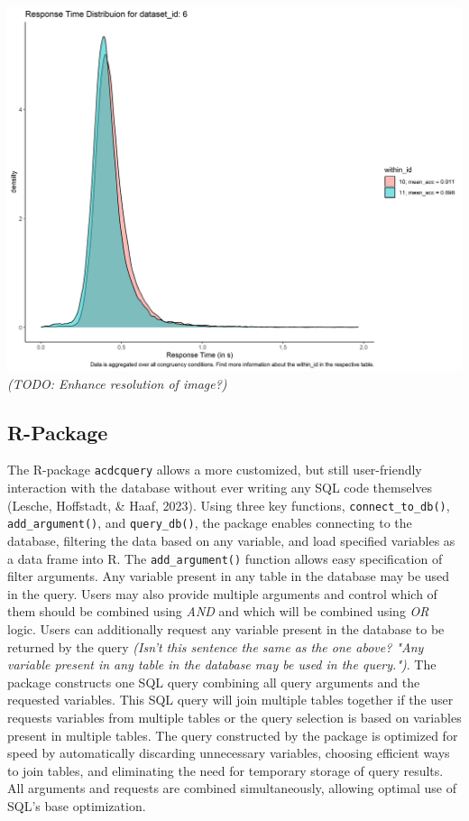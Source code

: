 \documentclass[
  man,floatsintext]{apa6}
\begin{document}
\includegraphics{images/example_descriptive_plot.png}
\emph{ (TODO: Enhance resolution of image?)}

\hypertarget{r-package}{%
\subsection{R-Package}\label{r-package}}

The R-package \texttt{acdcquery} allows a more customized, but still user-friendly interaction with the database without ever writing any SQL code themselves (Lesche, Hoffstadt, \& Haaf, 2023). Using three key functions, \texttt{connect\_to\_db()}, \texttt{add\_argument()}, and \texttt{query\_db()}, the package enables connecting to the database, filtering the data based on any variable, and load specified variables as a data frame into R. The \texttt{add\_argument()} function allows easy specification of filter arguments. Any variable present in any table in the database may be used in the query. Users may also provide multiple arguments and control which of them should be combined using \emph{AND} and which will be combined using \emph{OR} logic. Users can additionally request any variable present in the database to be returned by the query \emph{ (Isn't this sentence the same as the one above? "Any variable present in any table in the database may be used in the query.")}. The package constructs one SQL query combining all query arguments and the requested variables. This SQL query will join multiple tables together if the user requests variables from multiple tables or the query selection is based on variables present in multiple tables. The query constructed by the package is optimized for speed by automatically discarding unnecessary variables, choosing efficient ways to join tables, and eliminating the need for temporary storage of query results. All arguments and requests are combined simultaneously, allowing optimal use of SQL's base optimization.
\end{document}
